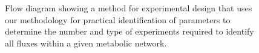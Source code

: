 \documentclass[10pt]{article}
\begin{document}
\begin{figure}[!tbhp]
	\caption{}\label{fig:v3_var_1_2_ck_ident}
\end{figure}

\begin{figure}[!tbhp]
	\caption{Flow diagram showing a method for experimental design that uses our methodology for practical identification of parameters to determine the number and type of experiments required to identify all fluxes within a given metabolic network.}\label{fig:ident-design}
\end{figure}
\end{document}
